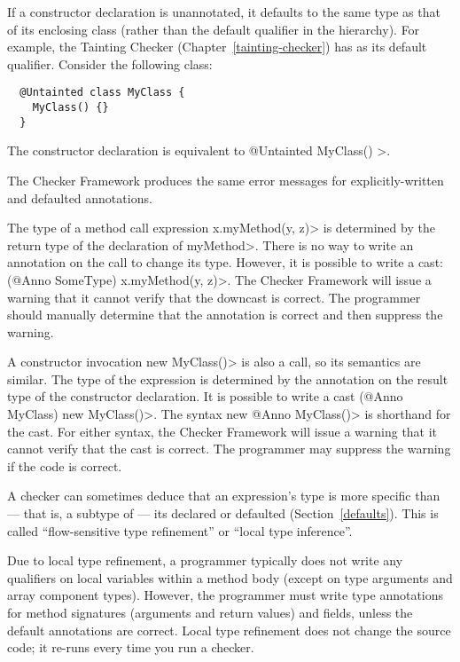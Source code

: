 
If a constructor declaration is unannotated, it defaults to the same type as that of
its enclosing class (rather than the default qualifier in the hierarchy).
For example, the Tainting Checker (Chapter~\ref{tainting-checker}) has 
as its default qualifier. Consider the following class:

\begin{Verbatim}
  @Untainted class MyClass {
    MyClass() {}
  }
\end{Verbatim}

\noindent
The constructor declaration is equivalent to \<@Untainted MyClass() \ttlcb\ttrcb>.

The Checker Framework produces the same error messages for
explicitly-written and defaulted annotations.



The type of a method call expression \<x.myMethod(y, z)> is determined by
the return type of the declaration of \<myMethod>.  There is no way to
write an annotation on the call to change its type.  However, it is
possible to write a cast:  \<(@Anno SomeType) x.myMethod(y, z)>.  The Checker
Framework will issue a warning that it cannot verify that the downcast is
correct.  The programmer should manually determine that the annotation is
correct and then suppress the warning.

A constructor invocation \<new MyClass()> is also a call, so its semantics
are similar.  The type of the expression is determined by the annotation on
the result type of the constructor declaration.  It is possible to write a cast
\<(@Anno MyClass) new MyClass()>.  The syntax \<new @Anno MyClass()> is shorthand
for the cast.  For either syntax, the Checker Framework will issue a
warning that it cannot verify that the cast is correct.  The programmer may
suppress the warning if the code is correct.



A checker can sometimes deduce that an expression's type is more specific
than --- that is, a subtype of --- its declared or defaulted (Section~\ref{defaults}).
This is called ``flow-sensitive type refinement'' or ``local type inference''.

Due to local type refinement, a programmer typically
does not write any qualifiers on local variables within a method body
(except on type arguments and array component types).
However, the programmer must write type annotations for method
signatures (arguments and return values) and fields, unless the default
annotations are correct.
Local type refinement does not change the source code; it re-runs every time
you run a checker.


